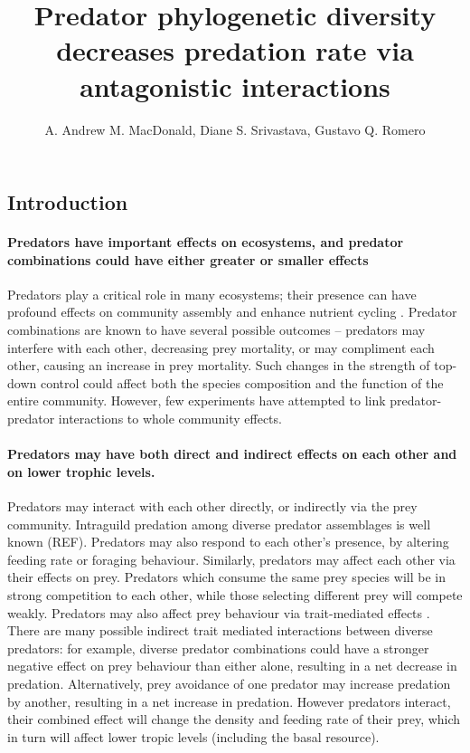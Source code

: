 \documentclass[10pt]{article}
\begin{document}
\title{Predator phylogenetic diversity decreases predation rate via
  antagonistic interactions} 
\author{A. Andrew M. MacDonald, Diane
  S. Srivastava, Gustavo Q. Romero}
\begin{spacing}{2}
\maketitle

\linenumbers

\section{Introduction}

\paragraph{Predators have important effects on ecosystems, and
  predator combinations could have either greater or smaller effects}
Predators play a critical role in many ecosystems; their presence can
have profound effects on community assembly \citep{Chase2009} and
enhance nutrient cycling \citep{Schmitz2010}.  Predator combinations
are known to have several possible outcomes -- predators may
interfere with each other, decreasing prey mortality, or may
compliment each other, causing an increase in prey mortality.  Such
changes in the strength of top-down control could affect both the
species composition and the function of the entire community.
However, few experiments have attempted to link predator-predator
interactions to whole community effects.

\paragraph{Predators may have both direct and indirect effects on each
  other and on lower trophic levels.} Predators may interact with each
other directly, or indirectly via the prey community.  Intraguild
predation among diverse predator assemblages is well known
(REF). Predators may also respond to each other's presence, by
altering feeding rate or foraging behaviour. Similarly, predators may
affect each other via their effects on prey.  Predators which consume
the same prey species will be in strong competition to each other,
while those selecting different prey will compete weakly.  Predators
may also affect prey behaviour via trait-mediated effects
\citep{Schmitz2007}. There are many possible indirect trait mediated
interactions between diverse predators: for example, diverse predator
combinations could have a stronger negative effect on prey behaviour
than either alone, resulting in a net decrease in predation.
Alternatively, prey avoidance of one predator may increase predation
by another, resulting in a net increase in predation. However
predators interact, their combined effect will change the
density and feeding rate of their prey, which in turn will affect
lower tropic levels (including the basal resource).  


\end{spacing}
\end{document}
